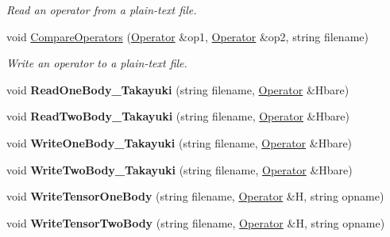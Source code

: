 \begin{DoxyCompactItemize}
\begin{DoxyCompactList}\small\item\em Read an operator from a plain-\/text file. \end{DoxyCompactList}\item 
void \hyperlink{classReadWrite_a1275273dc4057c79a8e8c7d96b74f359}{Compare\+Operators} (\hyperlink{classOperator}{Operator} \&op1, \hyperlink{classOperator}{Operator} \&op2, string filename)\hypertarget{classReadWrite_a1275273dc4057c79a8e8c7d96b74f359}{}\label{classReadWrite_a1275273dc4057c79a8e8c7d96b74f359}

\begin{DoxyCompactList}\small\item\em Write an operator to a plain-\/text file. \end{DoxyCompactList}\item 
void {\bfseries Read\+One\+Body\+\_\+\+Takayuki} (string filename, \hyperlink{classOperator}{Operator} \&Hbare)\hypertarget{classReadWrite_a5486b782a5b2e137fea52e28e592c1fa}{}\label{classReadWrite_a5486b782a5b2e137fea52e28e592c1fa}

\item 
void {\bfseries Read\+Two\+Body\+\_\+\+Takayuki} (string filename, \hyperlink{classOperator}{Operator} \&Hbare)\hypertarget{classReadWrite_a2c8e5f9f0f28a521501b3641390ecce4}{}\label{classReadWrite_a2c8e5f9f0f28a521501b3641390ecce4}

\item 
void {\bfseries Write\+One\+Body\+\_\+\+Takayuki} (string filename, \hyperlink{classOperator}{Operator} \&Hbare)\hypertarget{classReadWrite_a085e8fbf3a73da1e127e7454392e0bca}{}\label{classReadWrite_a085e8fbf3a73da1e127e7454392e0bca}

\item 
void {\bfseries Write\+Two\+Body\+\_\+\+Takayuki} (string filename, \hyperlink{classOperator}{Operator} \&Hbare)\hypertarget{classReadWrite_a7521de830de68614bb55147e4054c8df}{}\label{classReadWrite_a7521de830de68614bb55147e4054c8df}

\item 
void {\bfseries Write\+Tensor\+One\+Body} (string filename, \hyperlink{classOperator}{Operator} \&H, string opname)\hypertarget{classReadWrite_a95ee464b3c576804bf9a75694f39bbe3}{}\label{classReadWrite_a95ee464b3c576804bf9a75694f39bbe3}

\item 
void {\bfseries Write\+Tensor\+Two\+Body} (string filename, \hyperlink{classOperator}{Operator} \&H, string opname)\hypertarget{classReadWrite_a4d694656d136eb9f904b306e7cce9854}{}\label{classReadWrite_a4d694656d136eb9f904b306e7cce9854}


\end{DoxyCompactItemize}
